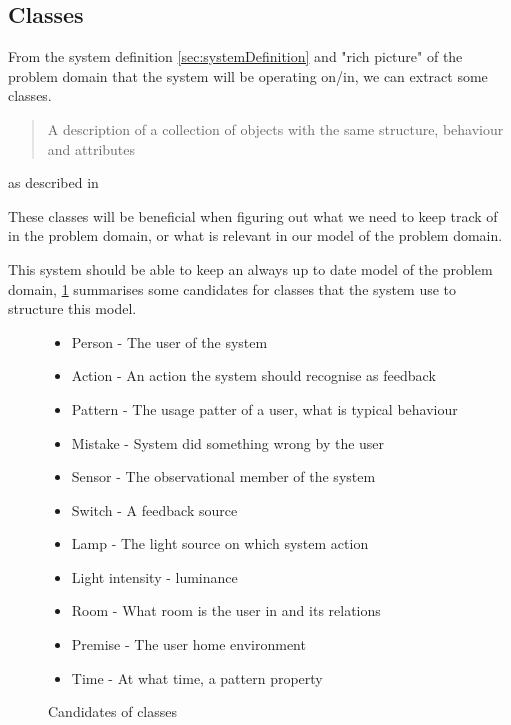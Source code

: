 \subsection{Classes}

From the system definition \cref{sec:systemDefinition} and "rich picture" of the problem domain that the system will be operating on/in, we can extract some classes. 

\begin{quote}
A description of a collection of objects with the same structure, behaviour and attributes
\end{quote}
as described in \cite{OOAD}

These classes will be beneficial when figuring out what we need to keep track of in the problem domain, or what is relevant in our model of the problem domain.

This system should be able to keep an always up to date model of the problem domain, \cref{lis:classes} summarises some candidates for classes that the system use to structure this model.

\begin{figure}
  \label{lis:classes}
  \begin{itemize}
    \item Person - The user of the system
    \item Action - An action the system should recognise as feedback
    \item Pattern - The usage patter of a user, what is typical behaviour
    \item Mistake - System did something wrong by the user
    \item Sensor - The observational member of the system
    \item Switch - A feedback source
    \item Lamp - The light source on which system action
    \item Light intensity - luminance
    \item Room - What room is the user in and its relations
    \item Premise - The user home environment
    \item Time - At what time, a pattern property
  \end{itemize}
  \caption{Candidates of classes}
\end{figure}
